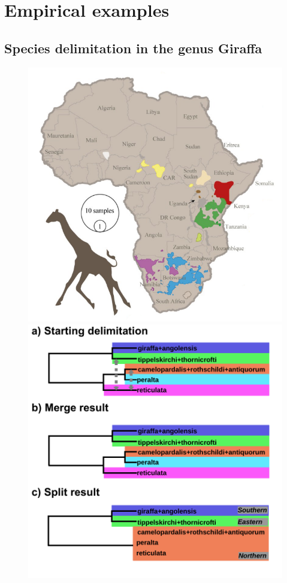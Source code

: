 \documentclass[A4]{article1}
\begin{document}
\newpage
\section{Empirical examples}

\subsection{Species delimitation in the genus Giraffa}

\begin{figure}[t]
    \centering %
    \includegraphics[scale=0.25]{figs/fig-giraffe} %
    \includegraphics[width=\linewidth]{figs/Giraffe/giraffe_progress_vector}  %
    

\end{figure}
\end{document}
